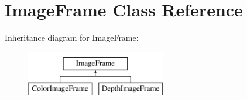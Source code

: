 \hypertarget{class_image_frame}{\section{\-Image\-Frame \-Class \-Reference}
\label{class_image_frame}
}
\-Inheritance diagram for \-Image\-Frame\-:\begin{figure}[H]
\begin{center}
\leavevmode
\includegraphics[height=2.000000cm]{class_image_frame}
\end{center}
\end{figure}
